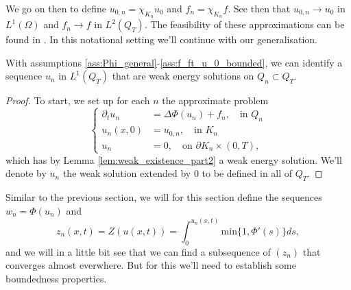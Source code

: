 \documentclass[11pt, a4paper]{article}
\begin{document}
We go on then to define $u_{0,n} = \chi_{K_n} u_0$ and $f_n = \chi_{K_n} f$. See then that $u_{0,n} \to u_0$ in $L^1(\Omega)$ and $f_n \to f$ in $L^2(Q_T)$. The feasibility of these approximations can be found in \citep[Sec. 5.3]{evans}. In this notational setting we'll continue with our generalisation.

\begin{lemma}
\label{prop:sequence_weak_solution_nonsmoothboundary}
With assumptions \ref{ass:Phi_general}-\ref{ass:f_ft_u_0_bounded}, we can identify a sequence $u_n$ in $L^1(Q_T)$ that are weak energy solutions on $Q_n \subset Q_T$. 
\end{lemma}
\begin{proof}
To start, we set up for each $n$ the approximate problem
\begin{equation}
\begin{cases}
\partial_t u_n &= \Delta \Phi(u_n) + f_n, \quad \text{in } Q_n \\
u_n(x,0) &= u_{0,n}, \quad \text{in } K_n \\
u_n &= 0, \quad \text{on } \partial K_n \times (0,T), 
\end{cases}
\end{equation}
which has by Lemma \ref{lem:weak_existence_part2} a weak energy solution. We'll denote by $u_n$ the weak solution extended by $0$ to be defined in all of $Q_T$.
\end{proof}

Similar to the previous section, we will for this section define the sequences $w_n = \Phi(u_n)$ and
\begin{equation}
z_n(x,t) = Z(u(x,t)) = \int_0^{u_n(x,t)} \mathrm{min}\{1, \Phi'(s)\} ds,
\end{equation}
and we will in a little bit see that we can find a subsequence of $(z_n)$ that converges almost everwhere. But for this we'll need to establish some boundedness properties.
\end{document}
